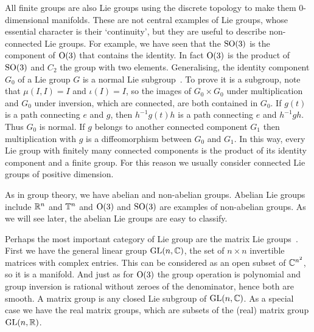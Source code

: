 All finite groups are also Lie groups using the discrete topology to make them $0$-dimensional manifolds.
These are not central examples of Lie groups, whose essential character is their `continuity', but they are useful to describe non-connected Lie groups.
For example, we have seen that the $\mathrm{SO}(3)$ is the component of $\mathrm{O}(3)$ that contains the identity.
In fact $\mathrm{O}(3)$ is the product of $\mathrm{SO}(3)$ and $C_2$ the group with two elements.
Generalising, the identity component $G_0$ of a Lie group $G$ is a normal Lie subgroup~\cite[Prop~1.10]{Hall2015}.
To prove it is a subgroup, note that $\mu(I,I) = I$ and $\iota(I) = I$, so the images of $G_0\times G_0$ under multiplication and $G_0$ under inversion, which are connected, are both contained in $G_0$.
If $g(t)$ is a path connecting $e$ and $g$, then $h^{-1}g(t)h$ is a path connecting $e$ and $h^{-1}gh$.
Thus $G_0$ is normal.
If $g$ belongs to another connected component $G_1$ then multiplication with $g$ is a diffeomorphism between $G_0$ and $G_1$.
In this way, every Lie group with finitely many connected components is the product of its identity component and a finite group.
For this reason we usually consider connected Lie groups of positive dimension.

As in group theory, we have abelian and non-abelian groups.
Abelian Lie groups include $\mathbb{R}^n$ and $\mathbb{T}^n$ and $\mathrm{O}(3)$ and $\mathrm{SO}(3)$ are examples of non-abelian groups.
As we will see later, the abelian Lie groups are easy to classify.

Perhaps the most important category of Lie group are the matrix Lie groups~\cite[Definition~1.4]{Hall2015}.
First we have the general linear group $\mathrm{GL}(n,\mathbb{C})$, the set of $n\times n$ invertible matrices with complex entries.
This can be considered as an open subset of $\mathbb{C}^{n^2}$, so it is a manifold. And just as for $\mathrm{O}(3)$ the group operation is polynomial and group inversion is rational without zeroes of the denominator, hence both are smooth.
A matrix group is any closed Lie subgroup of $\mathrm{GL}(n,\mathbb{C})$.
As a special case we have the real matrix groups, which are subsets of the (real) matrix group $\mathrm{GL}(n,\mathbb{R})$.

